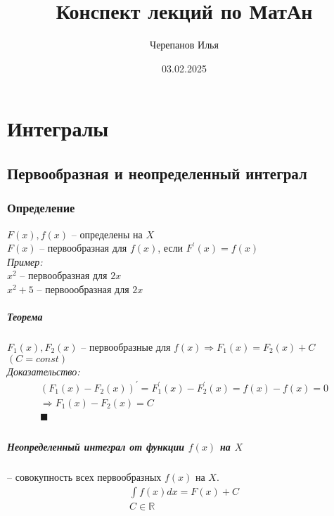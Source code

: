 \documentclass[12pt, fleqn]{book}
\title{Конспект лекций по МатАн}
\date{03.02.2025}
\author{Черепанов Илья}
\begin{document}
	\maketitle
	\tableofcontents{}
	\chapter{Интегралы}
	\section{Первообразная и неопределенный интеграл}
	\subsection{Определение}
	$F(x), f(x)$ -- определены на $X$\\
	$F(x)$ -- первообразная для $f(x)$, если $F^\prime(x)=f(x)$\\
	\textit{Пример:}\\
	$x^2$ -- первообразная для $2x$\\
	$x^2+5$ -- первоообразная для $2x$
	\paragraph{Теорема} $F_1(x), F_2(x)$ -- первообразные для $f(x) \Rightarrow F_1(x)=F_2(x)+C$ $(C=const)$\\
	\textit{Доказательство:}
	\begin{multline*}
		\left(F_1(x) - F_2(x)\right)^\prime = F_1^\prime(x) - F_2^\prime(x)=f(x)-f(x)=0\\
		\Rightarrow F_1(x)-F_2(x) = C\\
		\blacksquare\\
	\end{multline*}
	\paragraph{Неопределенный интеграл от функции $f(x)$ на $X$} -- совокупность всех первообразных $f(x)$ на $X$.
	\begin{multline*}
		\int f(x)dx=F(x)+C\\
		C\in \mathbb{R}\\
	\end{multline*}
\end{document}
